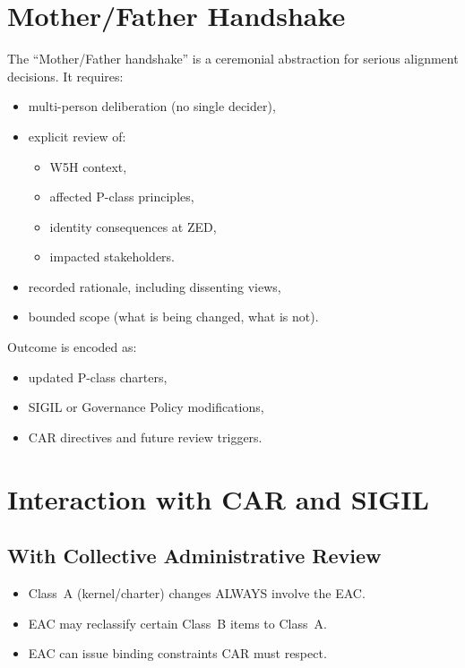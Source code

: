 \section{Mother/Father Handshake}

The ``Mother/Father handshake'' is a ceremonial abstraction for serious
alignment decisions. It requires:

\begin{itemize}
    \item multi-person deliberation (no single decider),
    \item explicit review of:
          \begin{itemize}
              \item W5H context,
              \item affected P-class principles,
              \item identity consequences at ZED,
              \item impacted stakeholders.
          \end{itemize}
    \item recorded rationale, including dissenting views,
    \item bounded scope (what is being changed, what is not).
\end{itemize}

Outcome is encoded as:
\begin{itemize}
    \item updated P-class charters,
    \item SIGIL or Governance Policy modifications,
    \item CAR directives and future review triggers.
\end{itemize}

\section{Interaction with CAR and SIGIL}

\subsection{With Collective Administrative Review}

\begin{itemize}
    \item Class~A (kernel/charter) changes ALWAYS involve the EAC.
    \item EAC may reclassify certain Class~B items to Class~A.
    \item EAC can issue binding constraints CAR must respect.
\end{itemize}

